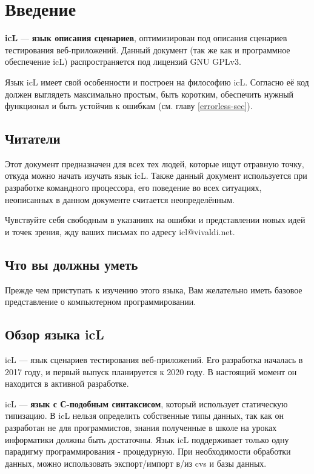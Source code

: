 \section{Введение}

\textbf{icL} — \textbf{язык описания сценариев}, оптимизирован под описания сценариев тестирования веб-приложений. Данный документ (так же как и программное обеспечение icL) распространяется под лицензий GNU GPLv3.

Язык icL имеет свой особенности и построен на философию icL. Согласно её код должен выглядеть максимально простым, быть коротким, обеспечить нужный функционал и быть устойчив к ошибкам (см. главу \ref{errorless-sec}).

\subsection{Читатели}

Этот документ предназначен для всех тех людей, которые ищут отравную точку, откуда можно начать изучать язык icL. Также данный документ используется при разработке командного процессора, его поведение  во всех ситуациях, неописанных в данном документе считается неопределённым.

Чувствуйте себя свободным в указаниях на ошибки и представлении новых идей и точек зрения, жду ваших письмах по адресу icl@vivaldi.net.

\subsection{Что вы должны уметь}

Прежде чем приступать к изучению этого языка, Вам желательно иметь базовое представление о компьютерном программировании.

\subsection{Обзор языка icL}

icL — язык сценариев тестирования веб-приложений. Его разработка началась в 2017 году, и первый выпуск планируется к 2020 году. В настоящий момент он находится в активной разработке.

icL — \textbf{язык с С-подобным синтаксисом}, который использует статическую типизацию. В icL нельзя определить собственные типы данных, так как он разработан не для программистов, знания полученные в школе на уроках информатики должны быть достаточны. Язык icL поддерживает только одну парадигму программирования - процедурную. При необходимости обработки данных, можно использовать экспорт/импорт в/из cvs и базы данных.

